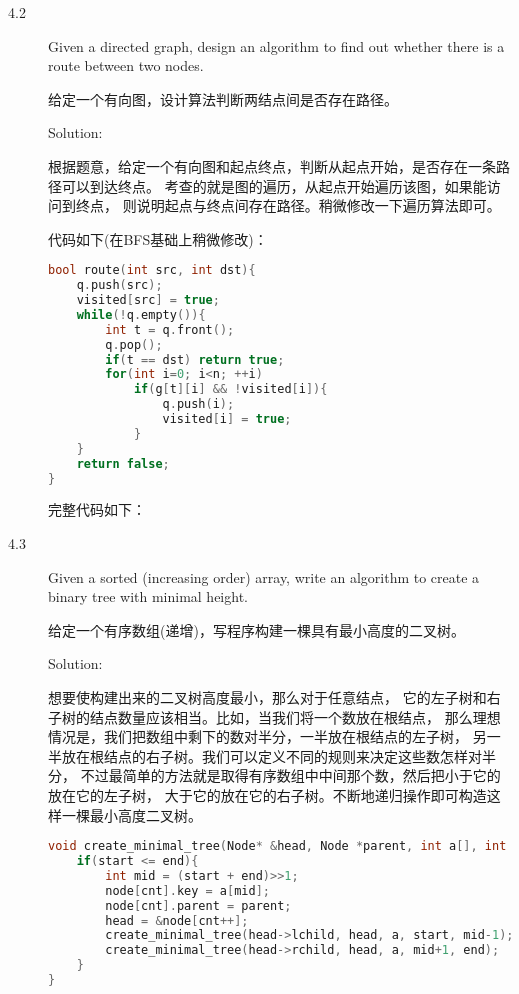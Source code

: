 \begin{description}



\item[4.2] Given a directed graph, design an algorithm to find out whether there is a route between two nodes.

给定一个有向图，设计算法判断两结点间是否存在路径。

Solution: 

根据题意，给定一个有向图和起点终点，判断从起点开始，是否存在一条路径可以到达终点。 考查的就是图的遍历，从起点开始遍历该图，如果能访问到终点， 则说明起点与终点间存在路径。稍微修改一下遍历算法即可。

代码如下(在BFS基础上稍微修改)：

\begin{lstlisting}[language=C++]
bool route(int src, int dst){
    q.push(src);
    visited[src] = true;
    while(!q.empty()){
        int t = q.front();
        q.pop();
        if(t == dst) return true;
        for(int i=0; i<n; ++i)
            if(g[t][i] && !visited[i]){
                q.push(i);
                visited[i] = true;
            }
    }
    return false;
}
\end{lstlisting}

完整代码如下：




\item[4.3] Given a sorted (increasing order) array, write an algorithm to create a binary tree with minimal height.

给定一个有序数组(递增)，写程序构建一棵具有最小高度的二叉树。

Solution: 

想要使构建出来的二叉树高度最小，那么对于任意结点， 它的左子树和右子树的结点数量应该相当。比如，当我们将一个数放在根结点， 那么理想情况是，我们把数组中剩下的数对半分，一半放在根结点的左子树， 另一半放在根结点的右子树。我们可以定义不同的规则来决定这些数怎样对半分， 不过最简单的方法就是取得有序数组中中间那个数，然后把小于它的放在它的左子树， 大于它的放在它的右子树。不断地递归操作即可构造这样一棵最小高度二叉树。

\begin{lstlisting}[language=C++]
void create_minimal_tree(Node* &head, Node *parent, int a[], int start, int end){
    if(start <= end){
        int mid = (start + end)>>1;
        node[cnt].key = a[mid];
        node[cnt].parent = parent;
        head = &node[cnt++];
        create_minimal_tree(head->lchild, head, a, start, mid-1);
        create_minimal_tree(head->rchild, head, a, mid+1, end);
    }
}
\end{lstlisting}


\end{description}
